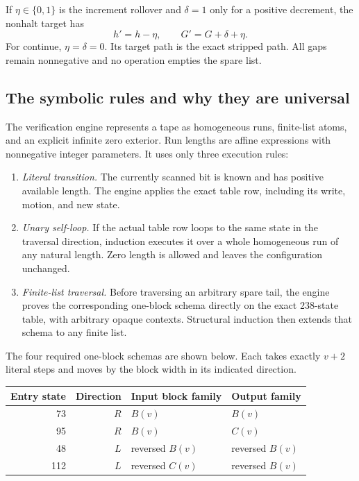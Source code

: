 \documentclass[11pt]{article}
\theoremstyle{definition}\newtheorem{definition}[theorem]{Definition}
\begin{document}
If $\eta\in\{0,1\}$ is the increment rollover and $\delta=1$ only for a
positive decrement, the nonhalt target has
\[
 h'=h-\eta,\qquad G'=G+\delta+\eta.
 \tag{9}
\]
For continue, $\eta=\delta=0$.  Its target path is the exact stripped path.
All gaps remain nonnegative and no operation empties the spare list.

\subsection{The symbolic rules and why they are universal}

The verification engine represents a tape as homogeneous runs, finite-list
atoms, and an explicit infinite zero exterior.  Run lengths are affine
expressions with nonnegative integer parameters.  It uses only three
execution rules:

\begin{enumerate}
\item \emph{Literal transition.} The currently scanned bit is known and
has positive available length.  The engine applies the exact table row,
including its write, motion, and new state.
\item \emph{Unary self-loop.} If the actual table row loops to the same
state in the traversal direction, induction executes it over a whole
homogeneous run of any natural length.  Zero length is allowed and leaves
the configuration unchanged.
\item \emph{Finite-list traversal.} Before traversing an arbitrary spare
tail, the engine proves the corresponding one-block schema directly on
the exact 238-state table, with arbitrary opaque contexts.  Structural
induction then extends that schema to any finite list.
\end{enumerate}

The four required one-block schemas are shown below.  Each takes exactly
$v+2$ literal steps and moves by the block width in its indicated direction.

\begin{center}
\begin{tabular}{rrll}
\toprule
Entry state & Direction & Input block family & Output family\\
\midrule
73 & $R$ & $B(v)$ & $B(v)$\\
95 & $R$ & $B(v)$ & $C(v)$\\
48 & $L$ & reversed $B(v)$ & reversed $B(v)$\\
112& $L$ & reversed $C(v)$ & reversed $B(v)$\\
\bottomrule
\end{tabular}
\end{center}
\end{document}
